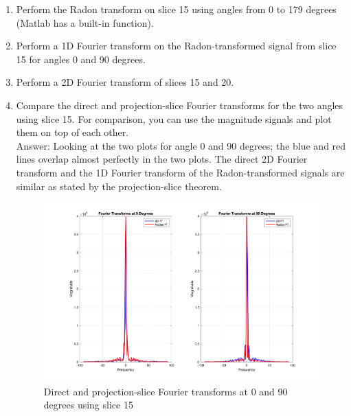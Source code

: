 \documentclass[12pt,twoside]{article}
\begin{document}
\begin{enumerate}
    \item Perform the Radon transform on slice 15 using angles from 0 to 179 degrees (Matlab has a built-in function).
    \item Perform a 1D Fourier transform on the Radon-transformed signal from slice 15 for angles 0 and 90 degrees.
    \item Perform a 2D Fourier transform of slices 15 and 20.
    \item Compare the direct and projection-slice Fourier transforms for the two angles using slice 15. 
    For comparison, you can use the magnitude signals and plot them on top of each other.\\
    Answer: Looking at the two plots for angle 0 and 90 degrees; 
    the blue and red lines overlap almost perfectly in the two plots. The direct 2D Fourier transform and the 1D Fourier transform of the Radon-transformed signals
    are similar as stated by the projection-slice theorem.
     \begin{figure}[H]
    \centering
    \captionsetup{justification=raggedright,singlelinecheck=false}
    \includegraphics[width=400pt]{fig1.png}
    \caption{Direct and projection-slice Fourier transforms  at 0 and 90 degrees using slice 15}
    \label{fig1}
     \end{figure}
    	

\end{enumerate}
\end{document}
